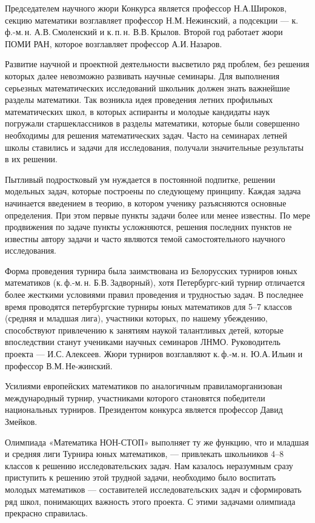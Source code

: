 \ms\abz Председателем научного жюри Конкурса является профессор Н.А.\linebreak Широков, секцию математики возглавляет профессор Н.М.\,Нежинский, а подсекции — к.\,ф.-м.\,н. А.В.\,Смоленский и к.\,п.\,н. В.В.\,Крылов. Второй год работает жюри ПОМИ РАН, которое возглавляет профессор А.И.\,Назаров.

\ms\abz Развитие научной и проектной деятельности высветило ряд проблем, без решения которых далее невозможно развивать научные семинары. Для выполнения серьезных математических исследований школьник должен знать важнейшие разделы математики. Так возникла идея проведения летних профильных математических школ, в которых аспиранты и молодые кандидаты наук погружали старшеклассников в разделы математики, которые были совершенно необходимы для решения математических задач. Часто на семинарах летней школы ставились и задачи для исследования, получали значительные результаты в их решении. 

\ms\abz Пытливый подростковый ум нуждается в постоянной подпитке, решении модельных задач, которые построены по следующему принципу. Каждая задача начинается введением в теорию, в котором ученику разъясняются основные определения. При этом первые пункты задачи более или менее известны. По мере продвижения по задаче пункты усложняются, решения последних пунктов не известны автору задачи и часто являются темой самостоятельного научного исследования.

\ms\abz Форма проведения турнира была заимствована из Белорусских турниров юных математиков (к.\,ф.-м.\,н. Б.В.\,Задворный), хотя Петербургс-\linebreak кий турнир отличается более жесткими условиями правил проведения и трудностью задач. В последнее время проводятся петербургские турниры юных математиков для 5–7 классов (средняя и младшая лига), участники которых, по нашему убеждению, способствуют привлечению к занятиям наукой талантливых детей, которые впоследствии станут учениками научных семинаров ЛНМО. Руководитель проекта — И.С.\,Алексеев. Жюри турниров возглавляют к.\,ф.-м.\,н. Ю.А.\,Ильин и профессор В.М.\,Не-\linebreak жинский.

\ms\abz Усилиями европейских математиков по аналогичным правилам\linebreak организован международный турнир, участниками которого становятся победители национальных турниров. Президентом конкурса является профессор Давид Змейков.  

\ms\abz Олимпиада «Математика НОН-СТОП» выполняет ту же функцию, что и младшая и средняя лиги Турнира юных математиков, — привлекать школьников 4–8 классов к решению исследовательских задач. Нам казалось неразумным сразу приступить к решению этой трудной задачи, необходимо было воспитать молодых математиков — составителей  исследовательских задач и сформировать ряд школ, понимающих важность этого проекта. С этими задачами олимпиада прекрасно справилась.

